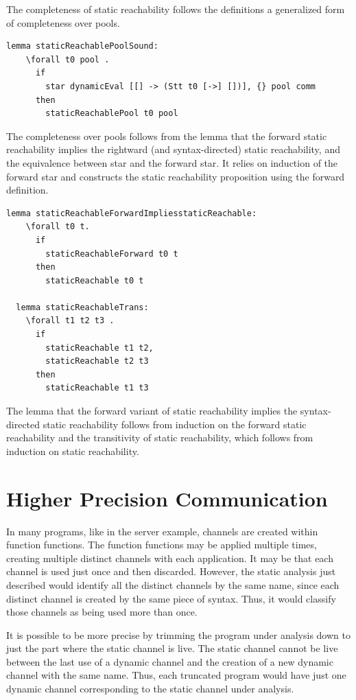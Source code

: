 \documentclass[letterpaper, 11pt]{extarticle}
\begin{document}
The completeness of static reachability follows the definitions
a generalized form of completeness over pools.

\begin{lstlisting}[language=logic, mathescape]
  lemma staticReachablePoolSound:
    \forall t0 pool .
      if
        star dynamicEval [[] -> (Stt t0 [->] [])], {} pool comm 
      then
        staticReachablePool t0 pool
\end{lstlisting}

The completeness over pools follows from the lemma that the forward
static reachability implies the rightward (and syntax-directed) static reachability,
and the equivalence between star and the forward star.  It relies on induction of the
forward star and constructs the static reachability
proposition using the forward definition.  

\begin{lstlisting}[language=logic, mathescape]
  lemma staticReachableForwardImpliesstaticReachable:
    \forall t0 t. 
      if
        staticReachableForward t0 t
      then
        staticReachable t0 t

  lemma staticReachableTrans:
    \forall t1 t2 t3 .
      if 
        staticReachable t1 t2,
        staticReachable t2 t3
      then
        staticReachable t1 t3
\end{lstlisting}

The lemma that the forward variant of static reachability implies the syntax-directed static
reachability follows from induction on the forward static reachability and the
transitivity of static reachability, which follows from induction on static reachability.

\section{Higher Precision Communication}
In many programs, like in the server example, channels are created within function functions.
The function functions may be applied multiple times, creating multiple distinct channels
with each application. It may be that each channel is used just once and then discarded.
However, the static analysis just described would identify all the distinct channels by the
same name, since each distinct channel is created by the same piece of syntax.
Thus, it would classify those channels as being used more than once.

It is possible to be more precise by trimming the program under analysis down to just the part
where the static channel is live. The static channel cannot be live between the last use of a
dynamic channel and the creation of a new dynamic channel with the same name.  Thus, each
truncated program would have just one dynamic channel corresponding to the static channel under
analysis. 
\end{document}
